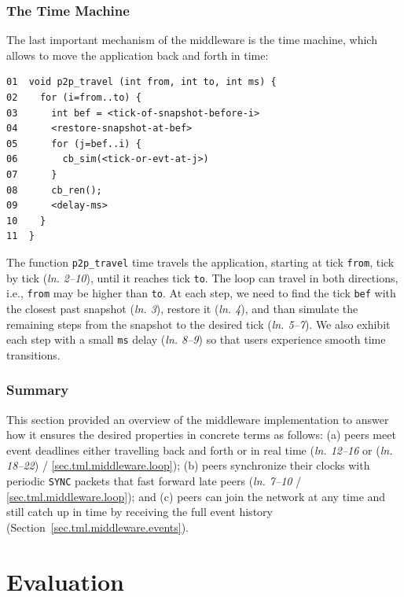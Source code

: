 \documentclass[fleqn,10pt]{SelfArx}
\newcommand{\code}[1]  {\texttt{\footnotesize{#1}}}
\newcommand{\lin}[1]{(\emph{ln. #1}\xspace)}
\newcommand{\linx}[1]{\emph{ln. #1}\xspace}
\begin{document}
\subsubsection{The Time Machine}
\label{sec.tml.middleware.travel}

The last important mechanism of the middleware is the time machine, which
allows to move the application back and forth in time:

{\footnotesize
\begin{verbatim}
01  void p2p_travel (int from, int to, int ms) {
02    for (i=from..to) {
03      int bef = <tick-of-snapshot-before-i>
04      <restore-snapshot-at-bef>
05      for (j=bef..i) {
06        cb_sim(<tick-or-evt-at-j>)
07      }
08      cb_ren();
09      <delay-ms>
10    }
11  }
\end{verbatim}
}

The function \code{p2p\_travel} time travels the application, starting at tick
\code{from}, tick by tick \lin{2--10}, until it reaches tick \code{to}.
The loop can travel in both directions, i.e., \code{from} may be higher than
\code{to}.
At each step, we need to find the tick \code{bef} with the closest past
snapshot \lin{3}, restore it \lin{4}, and than simulate the remaining steps
from the snapshot to the desired tick \lin{5--7}.
We also exhibit each step with a small \code{ms} delay \lin{8--9} so that users
experience smooth time transitions.

\subsubsection{Summary}
\label{sec.tml.middleware.summary}

This section provided an overview of the middleware implementation to answer
how it ensures the desired properties in concrete terms as follows:
    (a) peers meet event deadlines either travelling back and forth or in real
        time (\linx{12--16} or \lin{18--22} / \ref{sec.tml.middleware.loop});
    (b) peers synchronize their clocks with periodic \code{SYNC} packets that
        fast forward late peers
        (\linx{7--10} / \ref{sec.tml.middleware.loop}); and
    (c) peers can join the network at any time and still catch up in time by
        receiving the full event history
        (Section~\ref{sec.tml.middleware.events}).

\section{Evaluation}
\label{sec.eval}
\end{document}
